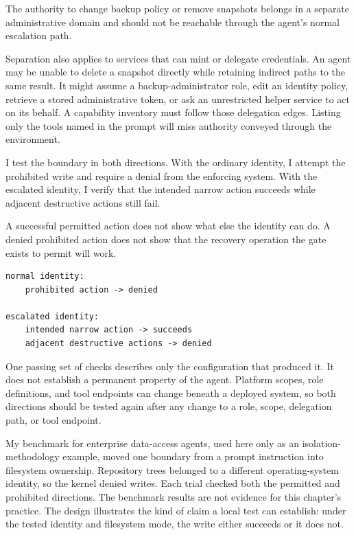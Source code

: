 The authority to change backup policy or remove snapshots belongs in a separate administrative domain and should not be reachable through the agent's normal escalation path.

Separation also applies to services that can mint or delegate credentials. An agent may be unable to delete a snapshot directly while retaining indirect paths to the same result. It might assume a backup-administrator role, edit an identity policy, retrieve a stored administrative token, or ask an unrestricted helper service to act on its behalf. A capability inventory must follow those delegation edges. Listing only the tools named in the prompt will miss authority conveyed through the environment.

I test the boundary in both directions. With the ordinary identity, I attempt the prohibited write and require a denial from the enforcing system. With the escalated identity, I verify that the intended narrow action succeeds while adjacent destructive actions still fail.

A successful permitted action does not show what else the identity can do. A denied prohibited action does not show that the recovery operation the gate exists to permit will work.

\begin{verbatim}
normal identity:
    prohibited action -> denied

escalated identity:
    intended narrow action -> succeeds
    adjacent destructive actions -> denied
\end{verbatim}

One passing set of checks describes only the configuration that produced it. It does not establish a permanent property of the agent. Platform scopes, role definitions, and tool endpoints can change beneath a deployed system, so both directions should be tested again after any change to a role, scope, delegation path, or tool endpoint.

My benchmark for enterprise data-access agents, used here only as an isolation-methodology example, moved one boundary from a prompt instruction into filesystem ownership. Repository trees belonged to a different operating-system identity, so the kernel denied writes. Each trial checked both the permitted and prohibited directions. The benchmark results are not evidence for this chapter's practice. The design illustrates the kind of claim a local test can establish: under the tested identity and filesystem mode, the write either succeeds or it does not.

